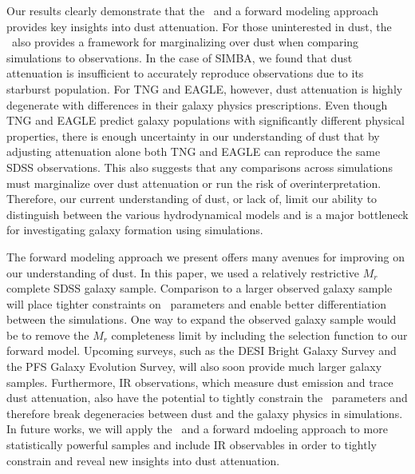Our results clearly demonstrate that the \eda~and a forward modeling approach
provides key insights into dust attenuation. For those uninterested in dust,
the \eda~also provides a framework for marginalizing over dust when comparing
simulations to observations. In the case of SIMBA, we found that dust
attenuation is insufficient to accurately reproduce observations due to its 
starburst population. For TNG and EAGLE, however, dust attenuation is highly
degenerate with differences in their galaxy physics
prescriptions. Even though TNG and EAGLE predict galaxy populations with
significantly different physical properties, there is enough uncertainty in our
understanding of dust that by adjusting attenuation alone both TNG and EAGLE
can reproduce the same SDSS observations. This also suggests that any
comparisons across simulations must marginalize over dust attenuation or run 
the risk of overinterpretation. Therefore, our current understanding of dust,
or lack of, limit
our ability to distinguish between the various hydrodynamical models and is a
major bottleneck for investigating galaxy formation using simulations.

The forward modeling approach we present offers many avenues for improving on
our understanding of dust. In this paper, we used a relatively restrictive 
$M_r$ complete SDSS galaxy sample. Comparison to a larger observed galaxy
sample will place tighter constraints on \eda~parameters and enable better
differentiation between the simulations. One way to expand the observed galaxy
sample would be to remove the $M_r$ completeness limit by including the
selection function to our forward model. Upcoming surveys, such as the DESI
Bright Galaxy Survey and the PFS Galaxy Evolution Survey, will also soon
provide much larger galaxy samples. Furthermore, IR observations, which measure
dust emission and trace dust attenuation, also have the potential to tightly 
constrain the \eda~parameters and therefore break degeneracies between dust
and the galaxy physics in simulations. In future works, we will apply the
\eda~and a forward mdoeling approach to more statistically powerful samples and
include IR observables in order to tightly constrain and reveal new insights 
into dust attenuation. 

